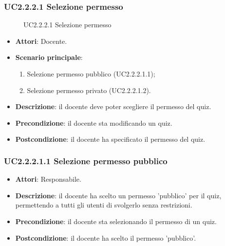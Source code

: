 \subsubsection{UC2.2.2.1 Selezione permesso}
\begin{figure}[H]
\centering
\noindent{}
\caption{UC2.2.2.1 Selezione permesso}
\end{figure}
\begin{itemize}
\item \textbf{Attori}: Docente.
\item \textbf{Scenario principale}:
\begin{enumerate}
\item Selezione permesso pubblico (UC2.2.2.1.1);
\item Selezione permesso privato (UC2.2.2.1.2).
\end{enumerate}
\item \textbf{Descrizione}: il docente deve poter scegliere il permesso del quiz.
\item \textbf{Precondizione}: il docente sta modificando un quiz.
\item \textbf{Postcondizione}: il docente ha specificato il permesso del quiz.
\end{itemize}
\subsubsection{UC2.2.2.1.1 Selezione permesso pubblico}
\begin{itemize}
\item \textbf{Attori}: Responsabile.
\item \textbf{Descrizione}: il docente ha scelto un permesso 'pubblico' per il quiz, permettendo a tutti gli utenti di svolgerlo senza restrizioni.
\item \textbf{Precondizione}: il docente sta selezionando il permesso di un quiz.
\item \textbf{Postcondizione}: il docente ha scelto il permesso 'pubblico'.
\end{itemize}
